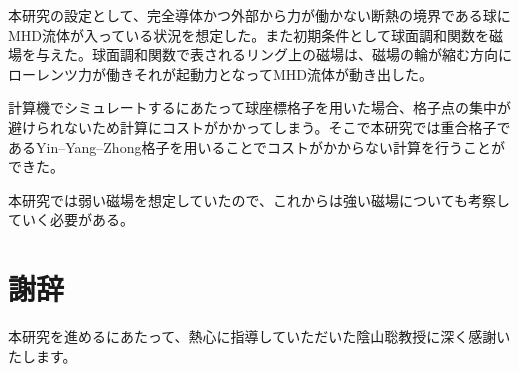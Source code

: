 \documentclass[12pt]{jsarticle}
\begin{document}
本研究の設定として、完全導体かつ外部から力が働かない断熱の境界である球にMHD流体が入っている状況を想定した。また初期条件として球面調和関数を磁場を与えた。球面調和関数で表されるリング上の磁場は、磁場の輪が縮む方向にローレンツ力が働きそれが起動力となってMHD流体が動き出した。

計算機でシミュレートするにあたって球座標格子を用いた場合、格子点の集中が避けられないため計算にコストがかかってしまう。そこで本研究では重合格子であるYin--Yang--Zhong格子を用いることでコストがかからない計算を行うことができた。

本研究では弱い磁場を想定していたので、これからは強い磁場についても考察していく必要がある。


\section*{謝辞}
本研究を進めるにあたって、熱心に指導していただいた陰山聡教授に深く感謝いたします。
\newpage


\end{document}

